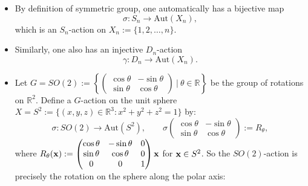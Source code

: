 \begin{example}
\begin{itemize}
    \item   By definition of symmetric group, one automatically has a bijective map
    $$\sigma: S_n \to \mathrm{Aut}(X_n),$$
    which is an $S_n$-action on $X_n := \{1,2, \dots, n\}$. \item Similarly, one also has an injective $D_n$-action
    $$\gamma: D_n \to \mathrm{Aut}(X_n).$$
    \item Let $G = SO(2) := \left\{\begin{pmatrix} \cos\theta & -\sin\theta  \\ \sin\theta & \cos\theta \end{pmatrix} \ {\Bigg|}\ \theta \in \mathbb{R} \right\}$ be the group of 
    rotations on $\mathbb{R}^2$. Define a $G$-action on the unit sphere $X =S^2 := \{ (x,y,z) \in \mathbb{R}^3 : x^2 + y^2 + z^2 = 1 \}$ by:
    $$\sigma : SO(2) \to \mathrm{Aut}(S^2), \quad \quad \sigma\begin{pmatrix} \cos\theta & -\sin\theta  \\ \sin\theta & \cos \theta \end{pmatrix} := R_\theta,$$
 where $R_{\theta}({\bf x}) := \begin{pmatrix} \cos\theta & -\sin\theta & 0 \\ \sin\theta & \cos\theta & 0 \\ 0 & 0 & 1 \end{pmatrix}{\bf x}$ for ${\bf x} \in S^2$. So the $SO(2)$-action is precisely the rotation on the sphere along the polar axis:
\begin{center}
\end{center}
\end{itemize}
\end{example}


